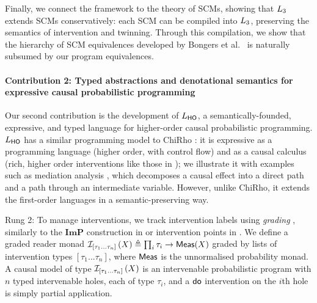 \documentclass[11pt,a4paper]{article}
\begin{document}
Finally, we connect the framework to the theory of SCMs, showing that $L_3$ extends SCMs conservatively: each SCM can be compiled into $L_3$, preserving the semantics of intervention and twinning. Through this compilation, we show that the hierarchy of SCM equivalences developed by Bongers et al.~\cite{Bongers_2021} is naturally subsumed by our program equivalences.

\paragraph{Contribution 2: Typed abstractions and denotational semantics for expressive causal probabilistic programming}\label{par:contrib2}
Our second contribution is the development of $L_{\mathsf{HO}}$, a semantically-founded, expressive, and typed language for higher-order causal probabilistic programming. $L_{\mathsf{HO}}$ has a similar programming model to ChiRho \cite{chirho,lafi-wang}: it is expressive as a programming language (higher order, with control flow) and as a causal calculus (rich, higher order interventions like those in ); we illustrate it with examples such as mediation analysis \cite{pearl2014interpretation}, which decomposes a causal effect into a direct path and a path through an intermediate variable. However, unlike ChiRho, it extends the first-order languages in a semantic-preserving way. 

Rung 2: To manage interventions, we track intervention labels using \emph{grading} \cite{orchard2020unifying,katsumata2014_graded_strong_monad,dorsch2019graded,fujii2016towards,sarkis2025string}, similarly to the $\mathbf{ImP}$ construction in \cite{liell2025compositional} or intervention points in \cite{lafi-wang}. We define a graded reader monad $\mathcal{I}_{[\tau_1...\tau_n]}\left(X\right) \triangleq \prod_i\tau_i \to \mathsf{Meas}(X)$ graded by lists of intervention types $[\tau_1...\tau_n]$, where $\mathsf{Meas}$ is the unnormalised probability monad. A causal model of type $\mathcal{I}_{[\tau_1...\tau_n]}\left(X\right)$ is an intervenable probabilistic program with $n$ typed intervenable holes, each of type $\tau_i$, and a $\mathsf{do}$ intervention on the $i$th hole is simply partial application.
\end{document}
